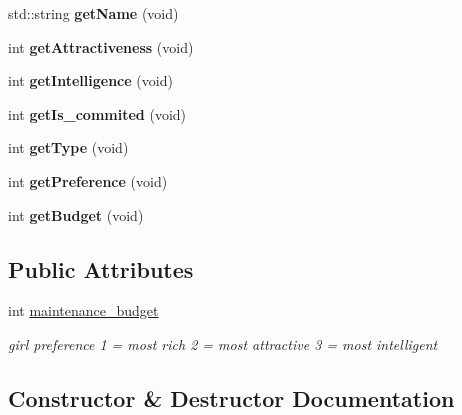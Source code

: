 \begin{DoxyCompactItemize}
std\+::string {\bfseries get\+Name} (void)
\item 
\mbox{\label{classgirl_a25c8b2bc2d3df50ca61417f0e8c4eef5}} 
int {\bfseries get\+Attractiveness} (void)
\item 
\mbox{\label{classgirl_a7cd49c129d9ede212cf24a0d93bfcc6a}} 
int {\bfseries get\+Intelligence} (void)
\item 
\mbox{\label{classgirl_aa1565f1f255770e69de297bb631a4ed8}} 
int {\bfseries get\+Is\+\_\+commited} (void)
\item 
\mbox{\label{classgirl_ac0eb402f33a9b066a89ae0eeda483ea4}} 
int {\bfseries get\+Type} (void)
\item 
\mbox{\label{classgirl_a445487f05d077114171887781a12e151}} 
int {\bfseries get\+Preference} (void)
\item 
\mbox{\label{classgirl_aff71d37b752b3501114356f862ae91a3}} 
int {\bfseries get\+Budget} (void)
\end{DoxyCompactItemize}
\subsection*{Public Attributes}
\begin{DoxyCompactItemize}
\item 
\mbox{\label{classgirl_a0d038ec12424d8b11fa0442bfa6fe2d6}} 
int \hyperlink{classgirl_a0d038ec12424d8b11fa0442bfa6fe2d6}{maintenance\+\_\+budget}
\begin{DoxyCompactList}\small\item\em girl preference \textquotesingle{}1\textquotesingle{} = most rich \textquotesingle{}2\textquotesingle{} = most attractive \textquotesingle{}3\textquotesingle{} = most intelligent \end{DoxyCompactList}\end{DoxyCompactItemize}


\subsection{Constructor \& Destructor Documentation}
\mbox{\label{classgirl_a583ce9589214531dc92c46e9d0eebc75}} 
